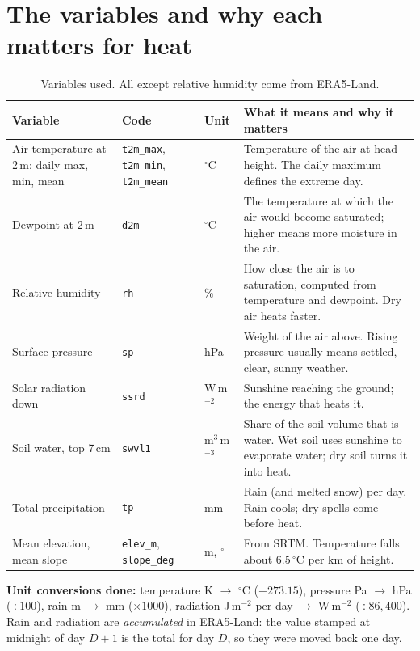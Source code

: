 \section{The variables and why each matters for heat}
\begin{table}[H]
\centering
\caption{Variables used. All except relative humidity come from ERA5-Land.}
\footnotesize
\begin{tabularx}{\textwidth}{>{\raggedright\arraybackslash}p{3.2cm}>{\raggedright\arraybackslash}p{1.4cm}>{\raggedright\arraybackslash}p{1.4cm}X}
\toprule
\textbf{Variable} & \textbf{Code} & \textbf{Unit} & \textbf{What it means and why it matters}\\
\midrule
Air temperature at 2\,m: daily max, min, mean & \texttt{t2m\_max}, \texttt{t2m\_min}, \texttt{t2m\_mean} & $^\circ$C
  & Temperature of the air at head height. The daily maximum defines the extreme day.\\
Dewpoint at 2\,m & \texttt{d2m} & $^\circ$C & The temperature at which the air would become saturated; higher means
  more moisture in the air.\\
Relative humidity & \texttt{rh} & \% & How close the air is to saturation, computed from temperature and dewpoint.
  Dry air heats faster.\\
Surface pressure & \texttt{sp} & hPa & Weight of the air above. Rising pressure usually means settled, clear, sunny
  weather.\\
Solar radiation down & \texttt{ssrd} & W\,m$^{-2}$ & Sunshine reaching the ground; the energy that heats it.\\
Soil water, top 7\,cm & \texttt{swvl1} & m$^3$\,m$^{-3}$ & Share of the soil volume that is water. Wet soil uses
  sunshine to evaporate water; dry soil turns it into heat.\\
Total precipitation & \texttt{tp} & mm & Rain (and melted snow) per day. Rain cools; dry spells come before heat.\\
Mean elevation, mean slope & \texttt{elev\_m}, \texttt{slope\_deg} & m, $^\circ$ & From SRTM. Temperature falls
  about 6.5\,$^\circ$C per km of height.\\
\bottomrule
\end{tabularx}
\end{table}

\textbf{Unit conversions done:} temperature K $\to$ $^\circ$C ($-273.15$), pressure Pa $\to$ hPa ($\div100$), rain
m $\to$ mm ($\times1000$), radiation J\,m$^{-2}$ per day $\to$ W\,m$^{-2}$ ($\div86{,}400$). Rain and radiation are
\emph{accumulated} in ERA5-Land: the value stamped at midnight of day $D+1$ is the total for day $D$, so they were moved
back one day.

